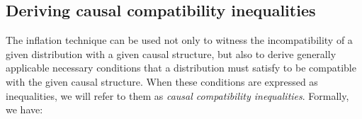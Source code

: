 

\subsection{Deriving causal compatibility inequalities}\label{Sec:DerivingInequalities}

The inflation technique can be used not only to witness the incompatibility of a given distribution with a given causal structure, but also to derive generally applicable necessary conditions that a distribution must satisfy to be compatible with the given causal structure. When these conditions are expressed as inequalities, we will refer to them as {\em causal compatibility inequalities}.  Formally, we have:

